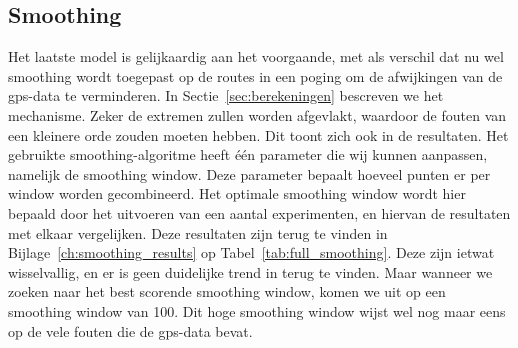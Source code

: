 \subsection{Smoothing}
Het laatste model is gelijkaardig aan het voorgaande, met als verschil dat nu
wel smoothing wordt toegepast op de routes in een poging om de afwijkingen van
de \ac{gps}-data te verminderen. In Sectie~\ref{sec:berekeningen} bescreven we
het mechanisme. Zeker de extremen zullen worden afgevlakt, waardoor de fouten
van een kleinere orde zouden moeten hebben. Dit toont zich ook in de
resultaten. Het gebruikte smoothing-algoritme heeft één parameter die wij
kunnen aanpassen, namelijk de smoothing window. Deze parameter bepaalt hoeveel
punten er per window worden gecombineerd. Het optimale smoothing window wordt
hier bepaald door het uitvoeren van een aantal experimenten, en hiervan de
resultaten met elkaar vergelijken. Deze resultaten zijn terug te vinden in
Bijlage~\ref{ch:smoothing_results} op Tabel~\ref{tab:full_smoothing}. Deze zijn
ietwat wisselvallig, en er is geen duidelijke trend in terug te vinden.
Maar wanneer we zoeken naar het best scorende smoothing window, komen we uit op
een smoothing window van 100. Dit hoge smoothing window wijst wel nog maar eens
op de vele fouten die de \ac{gps}-data bevat.

